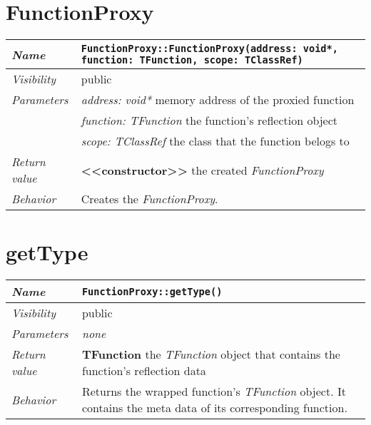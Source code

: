 \section{FunctionProxy}
\begin{longtable}{p{3cm} @{\hskip 1cm} p{12cm}}
	\hline

	\textit{Name} & \texttt{FunctionProxy::FunctionProxy(address: void*, function: TFunction, scope: TClassRef)}\\
	\hline

	\textit{Visibility} & public\\
	\hline

	\textit{Parameters} & \textit{address: void*} memory address of the proxied function\\
		& \textit{function: TFunction} the function's reflection object\\
		& \textit{scope: TClassRef} the class that the function belogs to\\
	\hline

	\textit{Return value} & \textbf{<<constructor>>} the created \textit{FunctionProxy}\\
	\hline

	\textit{Behavior} & Creates the \textit{FunctionProxy}.\\
	\hline

\end{longtable}
\pagebreak

\section{getType}
\begin{longtable}{p{3cm} @{\hskip 1cm} p{12cm}}
	\hline

	\textit{Name} & \texttt{FunctionProxy::getType()}\\
	\hline

	\textit{Visibility} & public\\
	\hline

	\textit{Parameters} & \textit{none}\\
	\hline

	\textit{Return value} & \textbf{TFunction} the \textit{TFunction} object that contains the function's reflection data\\
	\hline

	\textit{Behavior} & Returns the wrapped function's \textit{TFunction} object. It contains the meta data of its corresponding function.\\
	\hline

\end{longtable}
\pagebreak

